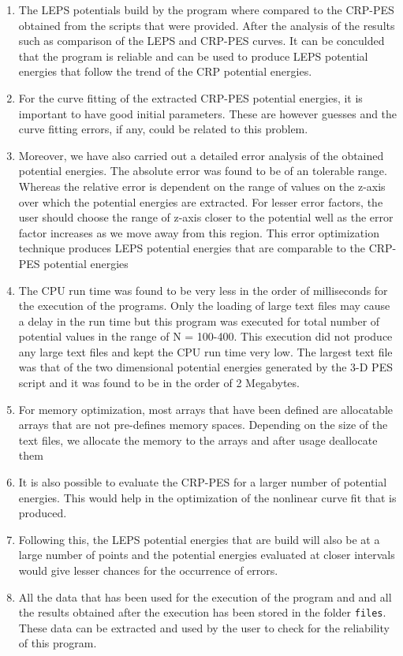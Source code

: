 \documentclass[12pt]{article}
\newcommand{\code}[1]{\colorbox{gray!18}{\texttt{#1}}}
\begin{document}
\begin{enumerate}
    \item The LEPS potentials build by the program where compared to the CRP-PES obtained from the scripts that were provided. After the analysis of the results such as comparison of the LEPS and CRP-PES curves. It can be conculded that the program is reliable and can be used to produce LEPS potential energies that follow the trend of the CRP potential energies.
    \item For the curve fitting of the extracted CRP-PES potential energies, it  is important to have good initial parameters. These are however guesses and the curve fitting errors, if any, could be related to this problem.
    \item Moreover, we have also carried out a detailed error analysis of the obtained potential energies. The absolute error was found to be of an tolerable range. Whereas the relative error is dependent on the range of values on the z-axis over which the potential energies are extracted. For lesser error factors, the user should choose the range of z-axis closer to the potential well as the error factor increases as we move away from this region. This error optimization technique produces LEPS potential energies that are comparable to the CRP-PES potential energies
    \item The CPU run time was found to be very less in the order of milliseconds for the execution of the programs. Only the loading of large text files may cause a delay in the run time but this program was executed for total number of potential values in the range of N = 100-400. This execution did not produce any large text files and kept the CPU run time very low. The largest text file  was that of the two dimensional potential energies generated by the 3-D PES script and it was found to be in the order of 2 Megabytes. 
    \item For memory optimization, most arrays that have been defined are allocatable arrays that are not pre-defines memory spaces. Depending on the size of the text files, we allocate the memory to the arrays and after usage deallocate them 
    \item It is also possible to evaluate the CRP-PES for a larger number of potential energies. This would help in the optimization of the nonlinear curve fit that is produced.
    \item Following this, the LEPS potential energies that are build will also be at a large number of points and the potential energies evaluated at closer intervals would give lesser chances for the occurrence of errors.
    \item All the data that has been used for the execution of the program and and all the results obtained after the execution has been stored in the folder {\fontsize{10}{6}\code{files}}. These data can be extracted and used by the user to check for the reliability of this program.
    
\end{enumerate}
\end{document}

